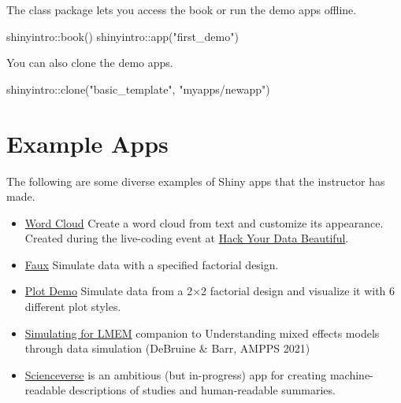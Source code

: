 \documentclass[
  oneside]{book}
\newenvironment{Shaded}{\begin{snugshade}}{\end{snugshade}}
\newcommand{\FunctionTok}[1]{\textcolor[rgb]{0.00,0.00,0.00}{#1}}
\newcommand{\NormalTok}[1]{#1}
\newcommand{\SpecialCharTok}[1]{\textcolor[rgb]{0.00,0.00,0.00}{#1}}
\newcommand{\StringTok}[1]{\textcolor[rgb]{0.31,0.60,0.02}{#1}}
\providecommand{\tightlist}{%
  \setlength{\itemsep}{0pt}\setlength{\parskip}{0pt}}
\begin{document}
The class package lets you access the book or run the demo apps offline.

\begin{Shaded}
\begin{Highlighting}[]
\NormalTok{shinyintro}\SpecialCharTok{::}\FunctionTok{book}\NormalTok{()}
\NormalTok{shinyintro}\SpecialCharTok{::}\FunctionTok{app}\NormalTok{(}\StringTok{"first\_demo"}\NormalTok{)}
\end{Highlighting}
\end{Shaded}

You can also clone the demo apps.

\begin{Shaded}
\begin{Highlighting}[]
\NormalTok{shinyintro}\SpecialCharTok{::}\FunctionTok{clone}\NormalTok{(}\StringTok{"basic\_template"}\NormalTok{, }\StringTok{"myapps/newapp"}\NormalTok{)}
\end{Highlighting}
\end{Shaded}

\hypertarget{example-apps}{%
\section{Example Apps}\label{example-apps}}

The following are some diverse examples of Shiny apps that the instructor has made.

\begin{itemize}
\tightlist
\item
  \href{https://shiny.psy.gla.ac.uk/debruine/wordcloud/}{Word Cloud} Create a word cloud from text and customize its appearance. Created during the live-coding event at \href{https://psyteachr.github.io/hack-your-data/}{Hack Your Data Beautiful}.
\item
  \href{https://shiny.psy.gla.ac.uk/debruine/fauxapp/}{Faux} Simulate data with a specified factorial design.
\item
  \href{https://shiny.psy.gla.ac.uk/debruine/plotdemo/}{Plot Demo} Simulate data from a 2×2 factorial design and visualize it with 6 different plot styles.
\item
  \href{https://shiny.psy.gla.ac.uk/lmem_sim/}{Simulating for LMEM} companion to Understanding mixed effects models through data simulation (DeBruine \& Barr, AMPPS 2021)
\item
  \href{http://shiny.ieis.tue.nl/scienceverse/}{Scienceverse} is an ambitious (but in-progress) app for creating machine-readable descriptions of studies and human-readable summaries.
\end{itemize}
\end{document}
